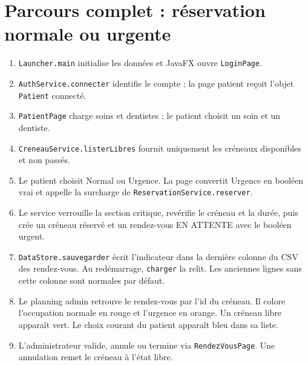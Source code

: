 \documentclass[11pt,a4paper]{report}
\begin{document}
\chapter{Parcours complet : réservation normale ou urgente}
\begin{enumerate}
\item \texttt{Launcher.main} initialise les données et JavaFX ouvre \texttt{LoginPage}.
\item \texttt{AuthService.connecter} identifie le compte ; la page patient reçoit l'objet \texttt{Patient} connecté.
\item \texttt{PatientPage} charge soins et dentistes ; le patient choisit un soin et un dentiste.
\item \texttt{CreneauService.listerLibres} fournit uniquement les créneaux disponibles et non passés.
\item Le patient choisit Normal ou Urgence. La page convertit Urgence en booléen vrai et appelle la surcharge de \texttt{ReservationService.reserver}.
\item Le service verrouille la section critique, revérifie le créneau et la durée, puis crée un créneau réservé et un rendez-vous EN ATTENTE avec le booléen urgent.
\item \texttt{DataStore.sauvegarder} écrit l'indicateur dans la dernière colonne du CSV des rendez-vous. Au redémarrage, \texttt{charger} la relit. Les anciennes lignes sans cette colonne sont normales par défaut.
\item Le planning admin retrouve le rendez-vous par l'id du créneau. Il colore l'occupation normale en rouge et l'urgence en orange. Un créneau libre apparaît vert. Le choix courant du patient apparaît bleu dans sa liste.
\item L'administrateur valide, annule ou termine via \texttt{RendezVousPage}. Une annulation remet le créneau à l'état libre.
\end{enumerate}
\end{document}
